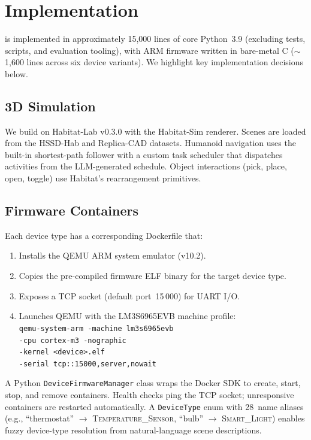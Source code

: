 \section{Implementation}\label{sec:implementation}

\sys{} is implemented in approximately 15{,}000 lines of core
Python~3.9 (excluding tests, scripts, and evaluation tooling),
with ARM firmware written in bare-metal C ($\sim$1{,}600 lines across
six device variants).  We highlight key implementation
decisions below.

\subsection{3D Simulation}

We build on Habitat-Lab v0.3.0 with the Habitat-Sim renderer.
Scenes are loaded from the HSSD-Hab and Replica-CAD datasets.
Humanoid navigation uses the built-in shortest-path follower with a
custom task scheduler that dispatches activities from the LLM-generated
schedule.  Object interactions (pick, place, open, toggle) use
Habitat's rearrangement primitives.

\subsection{Firmware Containers}

Each device type has a corresponding Dockerfile that:
\begin{enumerate}
  \item Installs the QEMU ARM system emulator (v10.2).
  \item Copies the pre-compiled firmware ELF binary for the
    target device type.
  \item Exposes a TCP socket (default port~15\,000) for UART I/O.
  \item Launches QEMU with the LM3S6965EVB machine profile:\\
    \texttt{qemu-system-arm -machine lm3s6965evb}\\
    \texttt{-cpu cortex-m3 -nographic}\\
    \texttt{-kernel <device>.elf}\\
    \texttt{-serial tcp::15000,server,nowait}
\end{enumerate}
A Python \texttt{DeviceFirmwareManager} class wraps the Docker SDK to
create, start, stop, and remove containers.  Health checks ping the
TCP socket; unresponsive containers are restarted automatically.
A \texttt{DeviceType} enum with 28~name aliases (e.g., ``thermostat''
$\to$ \textsc{Temperature\_Sensor}, ``bulb'' $\to$
\textsc{Smart\_Light}) enables fuzzy device-type resolution from
natural-language scene descriptions.

